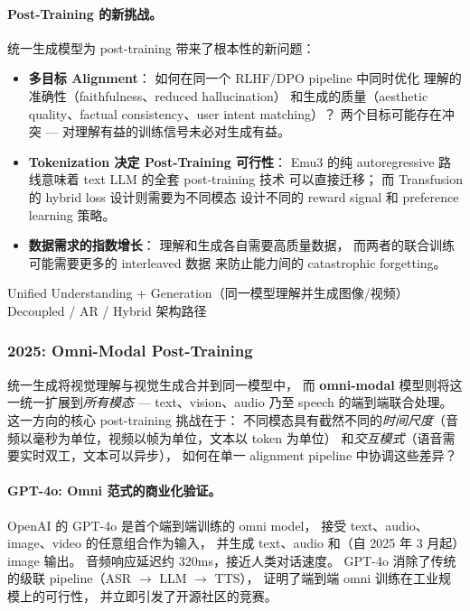\paragraph{Post-Training 的新挑战。}
统一生成模型为 post-training 带来了根本性的新问题：
\begin{itemize}[leftmargin=2em]
  \item \textbf{多目标 Alignment}：
    如何在同一个 RLHF/DPO pipeline 中同时优化
    理解的准确性（faithfulness、reduced hallucination）
    和生成的质量（aesthetic quality、factual consistency、user intent matching）？
    两个目标可能存在冲突 --- 对理解有益的训练信号未必对生成有益。
  \item \textbf{Tokenization 决定 Post-Training 可行性}：
    Emu3 的纯 autoregressive 路线意味着 text LLM 的全套 post-training 技术
    可以直接迁移；
    而 Transfusion 的 hybrid loss 设计则需要为不同模态
    设计不同的 reward signal 和 preference learning 策略。
  \item \textbf{数据需求的指数增长}：
    理解和生成各自需要高质量数据，
    而两者的联合训练可能需要更多的 interleaved 数据
    来防止能力间的 catastrophic forgetting。
\end{itemize}

  {Unified Understanding + Generation（同一模型理解并生成图像/视频）}
  {Decoupled / AR / Hybrid 架构路径}

\subsubsection{2025: Omni-Modal Post-Training}
\label{sec:t5-omni}

统一生成将视觉理解与视觉生成合并到同一模型中，
而 \textbf{omni-modal} 模型则将这一统一扩展到\textit{所有模态} ---
text、vision、audio 乃至 speech 的端到端联合处理。
这一方向的核心 post-training 挑战在于：
不同模态具有截然不同的\textit{时间尺度}（音频以毫秒为单位，视频以帧为单位，文本以 token 为单位）
和\textit{交互模式}（语音需要实时双工，文本可以异步），
如何在单一 alignment pipeline 中协调这些差异？

\paragraph{GPT-4o: Omni 范式的商业化验证。}
OpenAI 的 GPT-4o \cite{openai2024gpt4o} 是首个端到端训练的 omni model，
接受 text、audio、image、video 的任意组合作为输入，
并生成 text、audio 和（自 2025 年 3 月起）image 输出。
音频响应延迟约 320ms，接近人类对话速度。
GPT-4o 消除了传统的级联 pipeline（ASR $\rightarrow$ LLM $\rightarrow$ TTS），
证明了端到端 omni 训练在工业规模上的可行性，
并立即引发了开源社区的竞赛。

